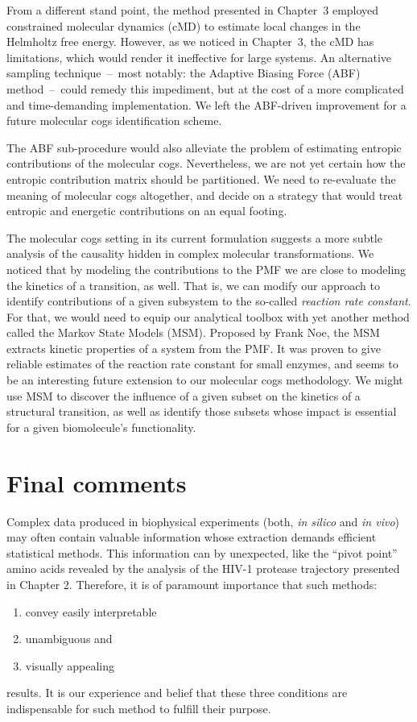 \documentclass[a4paper,11pt,twoside]{book}%
\begin{document}
From a different stand point, the method presented in Chapter~3 employed constrained molecular dynamics (cMD) to estimate local changes in the Helmholtz free energy.
However, as we noticed in Chapter~3, the cMD has limitations, which would render it ineffective for large systems.
An alternative sampling technique~--~most notably: the Adaptive Biasing Force (ABF) method~--~could remedy this impediment, but at the cost of a more complicated and time-demanding implementation.
We left the ABF-driven improvement for a future molecular cogs identification scheme.

The ABF sub-procedure would also alleviate the problem of estimating entropic contributions of the molecular cogs.
Nevertheless, we are not yet certain how the entropic contribution matrix should be partitioned.
We need to re-evaluate the meaning of molecular cogs altogether, and decide on a strategy that would treat entropic and energetic contributions on an equal footing.

The molecular cogs setting in its current formulation suggests a more subtle analysis of the causality hidden in complex molecular transformations.
We noticed that by modeling the contributions to the PMF we are close to modeling the kinetics of a transition, as well.
That is, we can modify our approach to identify contributions of a given subsystem to the so-called \emph{reaction rate constant}.
For that, we would need to equip our analytical toolbox with yet another method called the Markov State Models (MSM).
Proposed by Frank Noe, the MSM extracts kinetic properties of a system from the PMF.
It was proven to give reliable estimates of the reaction rate constant for small enzymes, and seems to be an interesting future extension to our molecular cogs methodology.
We might use MSM to discover the influence of a given subset on the kinetics of a structural transition, as well as identify those subsets whose impact is essential for a given biomolecule's functionality.

\section{Final comments}

Complex data produced in biophysical experiments (both, \emph{in silico} and \emph{in vivo}) may often contain valuable information whose extraction demands efficient statistical methods.
This information can by unexpected, like the ``pivot point'' amino acids revealed by the analysis of the HIV-1 protease trajectory presented in Chapter 2.
Therefore, it is of paramount importance that such methods:
\begin{enumerate}
 \item convey easily interpretable
 \item unambiguous and
 \item visually appealing
\end{enumerate}
results.
It is our experience and belief that these three conditions are indispensable for such method to fulfill their purpose.
\end{document}
